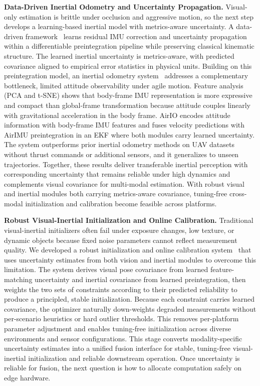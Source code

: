 \documentclass[conference]{IEEEtran}
\begin{document}
\medskip
\noindent\textbf{Data-Driven Inertial Odometry and Uncertainty Propagation.}
Visual-only estimation is brittle under occlusion and aggressive motion, so the next step develops a learning-based inertial model with metrics-aware uncertainty.
A data-driven framework~\cite{anonymous2025airimu} learns residual IMU correction and uncertainty propagation within a differentiable preintegration pipeline while preserving classical kinematic structure.
The learned inertial uncertainty is metrics-aware, with predicted covariance aligned to empirical error statistics in physical units.
Building on this preintegration model, an inertial odometry system~\cite{anonymous2025airio} addresses a complementary bottleneck, limited attitude observability under agile motion.
Feature analysis (PCA and t-SNE) shows that body-frame IMU representation is more expressive and compact than global-frame transformation because attitude couples linearly with gravitational acceleration in the body frame.
AirIO encodes attitude information with body-frame IMU features and fuses velocity predictions with AirIMU preintegration in an EKF where both modules carry learned uncertainty.
The system outperforms prior inertial odometry methods on UAV datasets without thrust commands or additional sensors, and it generalizes to unseen trajectories.
Together, these results deliver transferable inertial perception with corresponding uncertainty that remains reliable under high dynamics and complements visual covariance for multi-modal estimation.
With robust visual and inertial modules both carrying metrics-aware covariance, tuning-free cross-modal initialization and calibration become feasible across platforms.

\medskip
\noindent\textbf{Robust Visual-Inertial Initialization and Online Calibration.}
Traditional visual-inertial initializers often fail under exposure changes, low texture, or dynamic objects because fixed noise parameters cannot reflect measurement quality.
We developed a robust initialization and online calibration system~\cite{anonymous2026macinit} that uses uncertainty estimates from both vision and inertial modules to overcome this limitation.
The system derives visual pose covariance from learned feature-matching uncertainty and inertial covariance from learned preintegration, then weights the two sets of constraints according to their predicted reliability to produce a principled, stable initialization.
Because each constraint carries learned covariance, the optimizer naturally down-weights degraded measurements without per-scenario heuristics or hard outlier thresholds.
This removes per-platform parameter adjustment and enables tuning-free initialization across diverse environments and sensor configurations.
This stage converts modality-specific uncertainty estimates into a unified fusion interface for stable, tuning-free visual-inertial initialization and reliable downstream operation.
Once uncertainty is reliable for fusion, the next question is how to allocate computation safely on edge hardware.
\end{document}
